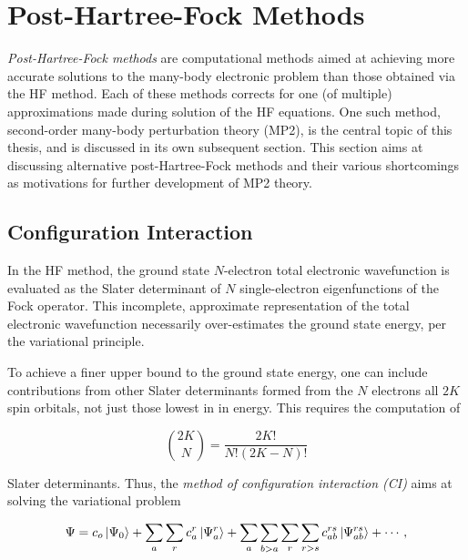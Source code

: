 %

\section{Post-Hartree-Fock Methods}
\label{s:post-hf}

\emph{Post-Hartree-Fock methods} are computational methods aimed at achieving
more accurate solutions to the many-body electronic problem than those obtained
via the HF method. Each of these methods corrects for one (of multiple)
approximations made during solution of the HF equations. One such method,
second-order many-body perturbation theory (MP2), is the central topic of this
thesis, and is discussed in its own subsequent section. This section aims at
discussing alternative post-Hartree-Fock methods and their various shortcomings
as motivations for further development of MP2 theory.

\subsection{Configuration Interaction}

In the HF method, the ground state $N$-electron total electronic wavefunction is
evaluated as the Slater determinant of $N$ single-electron eigenfunctions of the
Fock operator. This incomplete, approximate representation of the total
electronic wavefunction necessarily over-estimates the ground state energy, per
the variational principle.

To achieve a finer upper bound to the ground state energy, one can include
contributions from other Slater determinants formed from the $N$ electrons all
$2K$ spin orbitals, not just those lowest in in energy. This requires the
computation of

\begin{equation}
	\binom{2K}{N} = \frac{2K!}{N!(2K - N)!}
\end{equation}

\noindent Slater determinants. Thus, the \emph{method of configuration
interaction (CI)} aims at solving the variational problem

\begin{equation}
	\Psi = c_o \ket{\Psi_0} +  \sum_{a} \sum_{r} c_a^r \ket{\Psi_a^r}
	+ \sum_{a} \sum_{b > a} \sum_{r} \sum_{r > s} c_{ab}^{rs} \ket{\Psi_{ab}^{rs}}
	+ \cdots,
\label{eq:full-ci}
\end{equation}

